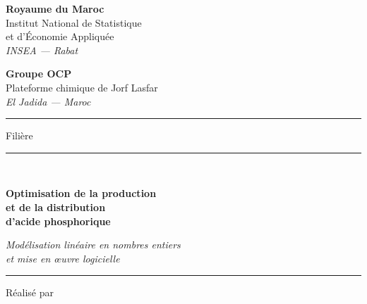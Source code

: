
\begin{titlepage}
\thispagestyle{empty}
\centering

\begin{minipage}[t]{0.47\textwidth}
  \raggedright
  {\bfseries\large Royaume du Maroc}\\[2pt]
  {\normalsize Institut National de Statistique\\ et d'Économie Appliquée}\\[2pt]
  {\small\itshape INSEA — Rabat}
\end{minipage}
\hfill
\begin{minipage}[t]{0.47\textwidth}
  \raggedleft
  {\bfseries\large Groupe OCP}\\[2pt]
  {\normalsize Plateforme chimique de Jorf Lasfar}\\[2pt]
  {\small\itshape El Jadida — Maroc}
\end{minipage}

\vspace{1.2cm}
{\color{ocpbleu}\rule{\textwidth}{1.2pt}}
\vspace{2.2cm}

{\Large\scshape \periodeStage\par}
\vspace{0.4cm}
{\large Filière \filiere\par}

\vspace{2.4cm}

{\color{ocpbleu}\rule{0.5\textwidth}{0.6pt}}\\[0.8cm]
{\Huge\bfseries\color{ocpbleu} Optimisation de la production\\[4pt]
et de la distribution\\[4pt] d'acide phosphorique\par}
\vspace{0.7cm}
{\large\itshape Modélisation linéaire en nombres entiers\\
et mise en œuvre logicielle\par}

\vspace{0.6cm}
{\color{ocpbleu}\rule{0.5\textwidth}{0.6pt}}

\vspace{2.6cm}

{\large Réalisé par\par}
\vspace{0.2cm}
{\LARGE\bfseries \auteur\par}


\end{titlepage}
